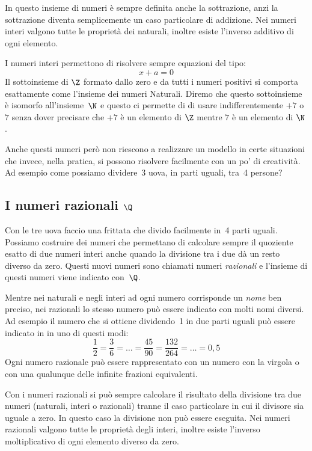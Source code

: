 In questo insieme di numeri è sempre definita anche la sottrazione, anzi la 
sottrazione diventa semplicemente un caso particolare di addizione.
Nei numeri interi valgono tutte le proprietà dei naturali, inoltre esiste 
l'inverso additivo di ogni elemento.

I numeri interi permettono di risolvere sempre equazioni del tipo: 
\[x+a=0\]
Il sottoinsieme di \(\Z\) formato dallo zero e da tutti i numeri positivi si 
comporta esattamente come l'insieme dei numeri Naturali. Diremo che questo 
sottoinsieme è isomorfo all'insieme~\(\N\) e questo ci permette di di usare 
indifferentemente \(+7\) o \(7\) senza dover precisare che \(+7\) è un elemento 
di \(\Z\) mentre \(7\) è un elemento di \(\N\).

Anche questi numeri però non riescono a realizzare un modello in certe 
situazioni che invece, nella pratica, si possono risolvere facilmente con un 
po' di creatività. Ad esempio come possiamo dividere~3 uova, in parti uguali, 
tra~4 persone?

\subsection{I numeri razionali \(\Q\)} 
\label{subsec:insnum_razionali}

Con le tre uova faccio una frittata che divido facilmente in~4 parti uguali. 
Possiamo costruire dei numeri che permettano di calcolare sempre il quoziente 
esatto di due numeri interi anche quando la divisione tra i due dà un resto 
diverso da zero. Questi nuovi numeri sono chiamati numeri \emph{razionali} e 
l'insieme di questi numeri viene indicato con~\(\Q\).

Mentre nei naturali e negli interi ad ogni numero corrisponde un \emph{nome} ben 
preciso, nei razionali lo stesso numero può essere indicato con molti nomi 
diversi. Ad esempio il numero che si ottiene dividendo~1 in due parti uguali può 
essere indicato in in uno di questi modi: 
\[\frac{1}{2}=\frac{3}{6}=\dots=\frac{45}{90}=\frac{132}{264}=\dots=0,5\]
Ogni numero razionale può essere rappresentato con un numero con la virgola o 
con una qualunque delle infinite frazioni equivalenti.

Con i numeri razionali si può sempre calcolare il risultato della divisione tra 
due numeri (naturali, interi o razionali) tranne il caso particolare in cui il 
divisore sia uguale a zero. In questo caso la divisione non può essere eseguita.
Nei numeri razionali valgono tutte le proprietà degli interi, inoltre esiste 
l'inverso moltiplicativo di ogni elemento diverso da zero.

